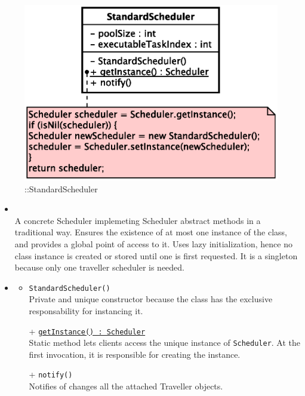 \begin{figure}[h]
\centering
\includegraphics[scale=0.6,keepaspectratio]{images/solution/app/backend/standard_scheduler.eps}
\caption{\pScheduling::StandardScheduler}
\label{fig:sd-app-scheduling-standard-scheduler}
\end{figure}
\FloatBarrier
\begin{itemize}
  \item \textbf{\descr} \\
    A concrete Scheduler implemeting Scheduler abstract methods in a traditional way.
    Ensures the existence of at most one instance of the class, 
 	and provides a global point of access to it.
  	Uses lazy initialization, hence no class instance is created 
  	or stored until one is first requested.
    It is a singleton because only one traveller scheduler is needed.
  \item \textbf{\ops}
  \begin{itemize}
    \item \texttt{StandardScheduler()} \\
    Private and unique constructor because the class has the exclusive 
    responsability for instancing it.
    \item[+] \texttt{\underline{getInstance() : Scheduler}} \\
    Static method lets clients access the unique instance 
    of \texttt{Scheduler}. At the first invocation, it is responsible 
    for creating the instance.
    \item[+] \texttt{notify()} \\
	Notifies of changes all the attached Traveller objects.
  \end{itemize}
\end{itemize}
